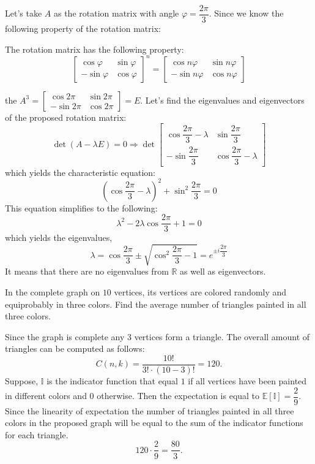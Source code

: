 \documentclass[12pt]{report}
\begin{document}
\begin{solution}
    Let's take $A$ as the rotation matrix with angle $\varphi = \dfrac{2\pi}{3}$. Since we know the following property of the rotation matrix:
    \begin{proposition}{}{}
        The rotation matrix has the following property:
        \[
            \left[\begin{array}{cc}
                \cos \varphi & \sin \varphi \\
                -\sin \varphi & \cos \varphi
            \end{array}\right]^n = \left[ \begin{array}{cc}
                \cos n\varphi & \sin n\varphi\\
                -\sin n\varphi & \cos n\varphi
            \end{array}\right]  
        \]
    \end{proposition}
    the $A^3 = \left[\begin{array}{cc} \cos 2\pi & \sin 2\pi \\  -\sin 2\pi & \cos 2\pi
    \end{array}\right] = E$. Let's find the eigenvalues and eigenvectors of the proposed rotation matrix:
    \[
        \operatorname{det} \left(A - \lambda E\right) = 0 \Longrightarrow \operatorname{det} \left[
            \begin{array}{cc}
                \cos \dfrac{2\pi}{3} - \lambda & \sin \dfrac{2\pi}{3} \\
                -\sin \dfrac{2\pi}{3} & \cos \dfrac{2\pi}{3} - \lambda
            \end{array}
        \right] 
    \]
    which yields the characteristic equation:
    \[
            \left(\cos \dfrac{2\pi}{3} - \lambda \right)^2 + \sin^2 \dfrac{2\pi}{3} = 0
    \]
    This equation simplifies to the following:
    \[
            \lambda^2 - 2\lambda \cos \dfrac{2\pi}{3} + 1 = 0
    \]
    which yields the eigenvalues,
    \[
            \lambda = \cos \dfrac{2\pi}{3} \pm \sqrt{\cos^2 \dfrac{2\pi}{3} - 1} = e^{\displaystyle\pm i\dfrac{2\pi}{3}}
    \]
    It means that there are no eigenvalues from $\mathbb{R}$ as well as eigenvectors.
\end{solution}
\begin{problem}{}
    In the complete graph on $10$ vertices, its vertices are colored randomly and
equiprobably in three colors. Find the average number of triangles painted in all
three colors.
\end{problem}
\begin{solution}
    Since the graph is complete any 3 vertices form a triangle. The overall amount of triangles can be computed as follows:
    \[
        C(n,k) = \dfrac{10!}{3!\cdot (10-3)!} = 120.
    \]
    Suppose, $\mathbb{I}$ is the indicator function that equal $1$ if all vertices have been painted in different colors and $0$ otherwise. Then the expectation is equal to $\mathbb{E} [\mathbb{I}] = \dfrac{2}{9}$. Since the linearity of expectation the number of triangles painted in all three colors in the proposed graph will be equal to the sum of the indicator functions for each triangle.
    \[
        120 \cdot \dfrac{2}{9} = \dfrac{80}{3}.  
    \]
\end{solution}
\end{document}
